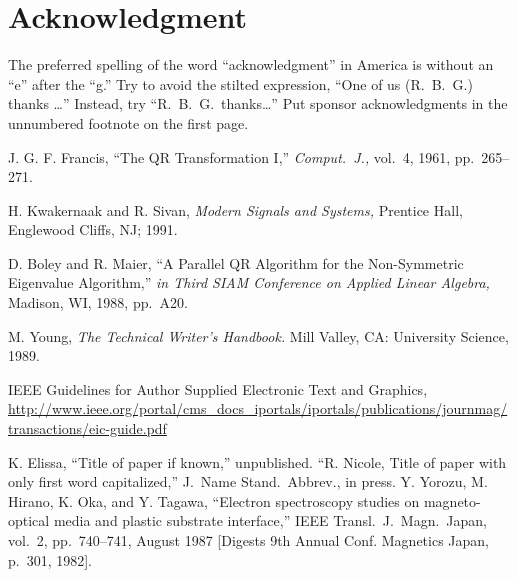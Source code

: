 \documentclass[conference]{IEEEtran}
\begin{document}
\section*{Acknowledgment}
The preferred spelling of the word ``acknowledgment'' in America is without an ``e'' after the ``g.''  Try to avoid the stilted expression, ``One of us (R.~B.~G.) thanks \dots'' Instead, try ``R.~B.~G.\ thanks\dots''  Put sponsor acknowledgments in the unnumbered footnote on the first page.


\begin{thebibliography}{99}

J. G. F. Francis, ``The QR Transformation I,'' {\it Comput.\ J.,} vol.~4, 1961, pp.~265--271.

H. Kwakernaak and R. Sivan, {\it Modern Signals and Systems,} Prentice Hall, Englewood Cliffs, NJ; 1991.

D. Boley and R. Maier, ``A Parallel QR Algorithm for the Non-Symmetric Eigenvalue Algorithm,'' {\it in Third SIAM Conference on Applied Linear Algebra,} Madison, WI, 1988, pp.~A20.


M. Young, {\it The Technical Writer's Handbook.} Mill Valley, CA:  University Science, 1989.

IEEE Guidelines for Author
Supplied Electronic
Text and Graphics, \url{http://www.ieee.org/portal/cms_docs_iportals/iportals/publications/journmag/transactions/eic-guide.pdf}

 K. Elissa, ``Title of paper if known,'' unpublished.
 ``R. Nicole, Title of paper with only first word capitalized,'' J.\ Name Stand.\ Abbrev., in press.
 Y. Yorozu, M. Hirano, K. Oka, and Y. Tagawa, ``Electron spectroscopy studies on magneto-optical media and plastic substrate interface,'' IEEE Transl.\ J.\ Magn.\ Japan, vol.~2, pp.~740--741, August 1987 [Digests 9th Annual Conf. Magnetics Japan, p.~301, 1982].

\end{thebibliography}
\end{document}
